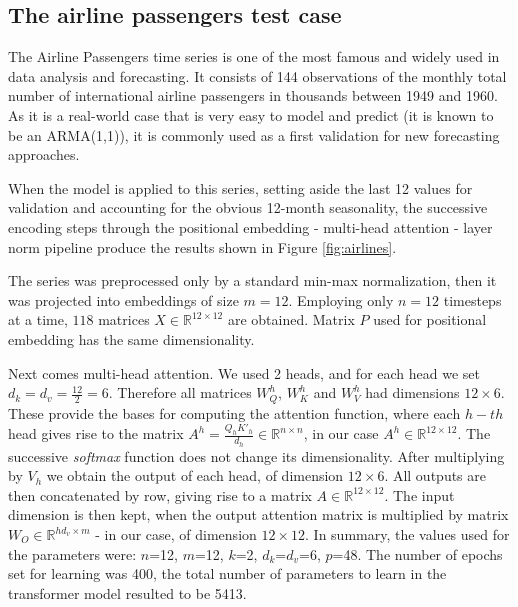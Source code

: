 \documentclass[algorithms,article,submit,pdftex,moreauthors]{Definitions/mdpi}
\begin{document}
\subsection{The airline passengers test case} \label{subsec:airlines}

The Airline Passengers time series is one of the most famous and widely used in data analysis and forecasting. It consists of 144 observations of the monthly total number of international airline passengers in thousands between 1949 and 1960. As it is a real-world case that is very easy to model and predict (it is known to be an ARMA(1,1)), it is commonly used as a first validation for new forecasting approaches.

When the model is applied to this series, setting aside the last 12 values for validation and accounting for the obvious 12-month seasonality, the successive encoding steps through the positional embedding - multi-head attention - layer norm pipeline produce the results shown in Figure \ref{fig:airlines}.

The series was preprocessed only by a standard min-max normalization, then it was projected into embeddings of size $m = 12$. Employing only $n = 12$ timesteps at a time, $118$ matrices $X \in \mathbb{R}^{12 \times 12}$ are obtained. Matrix $P$ used for positional embedding has the same dimensionality.

Next comes multi-head attention. We used 2 heads, and for each head we set $d_k = d_v = \frac{12}{2} = 6$. Therefore all matrices $W^h_Q$, $W^h_K$ and $W^h_V$ had dimensions $12 \times 6$. These provide the bases for computing the attention function, where each $h-th$ head gives rise to the matrix $A^h=\frac{Q_hK'_h}{d_h} \in \mathbb{R}^{n \times n}$, in our case $A^h \in \mathbb{R}^{12 \times 12}$. The successive {\em softmax} function does not change its dimensionality. After multiplying by $V_h$ we obtain the output of each head, of dimension $12 \times 6$. All outputs are then concatenated by row, giving rise to a matrix $A \in \mathbb{R}^{12 \times 12}$. The input dimension is then kept, when the output attention matrix is multiplied by matrix $W_O \in \mathbb{R}^{hd_v \times m}$ - in our case, of dimension $12 \times 12$. In summary, the values used for the parameters were: $n$=12, $m$=12, $k$=2,  $d_k$=$d_v$=6, $p$=48. The number of epochs set for learning was 400, the total number of parameters to learn in the transformer model resulted to be 5413.
\end{document}
